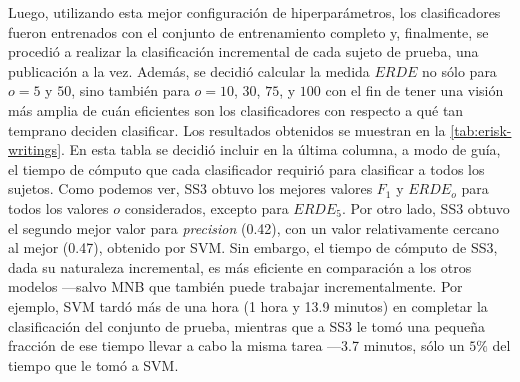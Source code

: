 Luego, utilizando esta mejor configuración de hiperparámetros, los clasificadores fueron entrenados con el conjunto de entrenamiento completo y, finalmente, se procedió a realizar la clasificación incremental de cada sujeto de prueba, una publicación a la vez. Además, se decidió calcular la medida $ERDE$ no sólo para $o = 5$ y $50$, sino también para $o = 10$, $30$, $75$, y $100$ con el fin de tener una visión más amplia de cuán eficientes son los clasificadores con respecto a qué tan temprano deciden clasificar. Los resultados obtenidos se muestran en la \autoref{tab:erisk-writings}.
En esta tabla se decidió incluir en la última columna, a modo de guía, el tiempo de cómputo que cada clasificador requirió para clasificar a todos los sujetos. Como podemos ver, SS3 obtuvo los mejores valores $F_1$ y $ERDE_o$ para todos los valores $o$ considerados, excepto para $ERDE_5$.
Por otro lado, SS3 obtuvo el segundo mejor valor para \emph{precision} (0.42), con un valor relativamente cercano al mejor (0.47), obtenido por \ac{SVM}.
Sin embargo, el tiempo de cómputo de SS3, dada su naturaleza incremental, es más eficiente en comparación a los otros modelos ---salvo \ac{MNB} que también puede trabajar incrementalmente. Por ejemplo, \ac{SVM} tardó más de una hora (1 hora y 13.9 minutos) en completar la clasificación del conjunto de prueba, mientras que a SS3 le tomó una pequeña fracción de ese tiempo llevar a cabo la misma tarea ---3.7 minutos, sólo un $5\%$ del tiempo que le tomó a \ac{SVM}.

